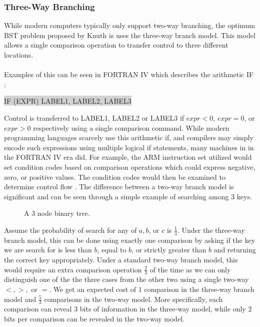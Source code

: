 \documentclass[]{beamer}
\theoremstyle{plain}
\begin{document}
\begin{frame} \frametitle{Three-Way Branching}


While modern computers typically only support two-way branching, the optimum BST problem proposed by Knuth is uses the three-way branch model. This model allows a single comparison operation to transfer control to three different locations. \\~\\ Examples of this can be seen in FORTRAN IV which describes the arithmetic IF \cite{Dock:228063}:

\colorbox{lightgrey}{ \selectfont \uppercase{IF (expr) label1, label2, label3} } 
 
\noindent Control is transferred to \uppercase{label1}, \uppercase{label2} or \uppercase{label3} if $expr < 0$, $expr=0$, or $expr > 0$ respectively using a single comparison command. While modern programming languages scarcely use this arithmetic if, and compilers may simply encode such expressions using multiple logical if statements, many machines in in the FORTRAN IV era did. For example, the ARM instruction set utilized would set condition codes based on comparison operations which could express negative, zero, or positive values. The condition codes would then be examined to determine control flow \cite{ARM}. The difference between a two-way branch model is significant and can be seen through a simple example of searching among 3 keys.

\begin{figure}[!ht]
\begin{center}

\caption{A 3 node binary tree.}

\end{center}
\end{figure}

Assume the probability of search for any of $a,b$, or $c$ is $\frac{1}{3}$. Under the three-way branch model, this can be done using exactly one comparison by asking if the key we are search for is less than $b$, equal to $b$, or strictly greater than $b$ and returning the correct key appropriately. Under a standard two-way branch model, this would require an extra comparison operation $\frac{2}{3}$ of the time as we can only distinguish one of the the three cases from the other two using a single two-way $<, >,$ or $=$. We get an expected cost of $1$ comparison in the three-way branch model and $\frac{5}{3}$ comparisons in the two-way model. More specifically, each comparison can reveal $3$ bits of information in the three-way model, while only $2$ bits per comparison can be revealed in the two-way model. 
\end{frame}
\end{document}
